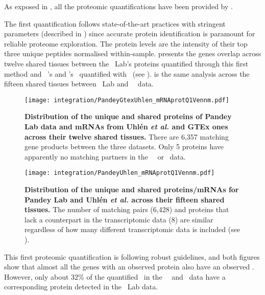 As exposed in ,
all the proteomic quantifications have been provided by \james.\mybr\

The first quantification follows state-of-the-art practices
with stringent parameters (described in )
since accurate protein identification is paramount
for reliable proteome exploration.
The protein levels are
the intensity of their top three unique peptides normalised within-sample.
 presents
the genes overlap across twelve shared tissues
between the \pandey\ Lab's proteins quantified through this first method
and \uhlen\ \etal{}'s and \gtex{}'s \mRNAs\ quantified
with \htseq\ (see ).
 is the same analysis across the fifteen shared tissues
between \pandey\ Lab and \uhlen\ \etal\ data.\mybr\
\vspace{5mm}

\begin{figure}[!htb]
    \texttt{[image: integration/PandeyGtexUhlen\_mRNAprotQ1Vennm.pdf]}\centering
    \caption[Distribution of the unique and shared proteins/mRNAs for the three datasets
    across twelve tissues]{%
    \label{fig:PGU_vennQ1}\textbf{Distribution of the unique and shared proteins
    of Pandey Lab data and mRNAs from Uhlén \textit{et al.} and GTEx ones across
    their twelve shared tissues.}
    There are 6,357 matching gene products between the three datasets.
    Only 5 proteins have apparently no matching partners
    in the \uhlen\ \etal\ or \gtex\ data.}
\end{figure}


\begin{figure}[!htb]
    \texttt{[image: integration/PandeyUhlen\_mRNAprotQ1Vennm.pdf]}\centering
    \caption[Distribution of the unique and shared proteins/mRNAs for Pandey Lab
    and Uhlén \textit{et al.} across fifteen tissues.]{%
    \label{fig:PU_vennQ1}\textbf{Distribution of the unique and shared proteins/mRNAs
    for Pandey Lab and Uhlén \textit{et al.} across their fifteen shared tissues.}
    The number of matching pairs (6,428) and proteins that lack a counterpart in
    the transcriptomic data (8) are similar regardless of how many different
    transcriptomic data is included (see \Cref{fig:PGU_vennQ1}).}
\end{figure}

This first proteomic quantification is following robust guidelines,
and both figures show that
almost all the genes with an observed protein
also have an observed \mRNA{}.
However, only about 32\% of the quantified \mRNAs\
in the \uhlen\ \etal\ and \gtex\ data
have a corresponding protein detected in the \pandey\ Lab data.\mybr\

